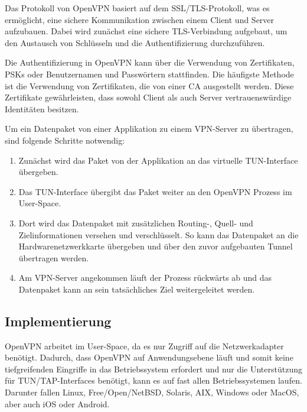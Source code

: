 Das Protokoll von OpenVPN basiert auf dem SSL/TLS-Protokoll, was es ermöglicht, eine sichere Kommunikation zwischen einem Client und Server aufzubauen. Dabei wird zunächst eine sichere TLS-Verbindung aufgebaut, um den Austausch von Schlüsseln und die Authentifizierung durchzuführen. \cite{Mastering_OpenVPN}

Die Authentifizierung in OpenVPN kann über die Verwendung von Zertifikaten, \gls{PSKs} oder Benutzernamen und Passwörtern stattfinden. Die häufigste Methode ist die Verwendung von Zertifikaten, die von einer \gls{CA} ausgestellt werden. Diese Zertifikate gewährleisten, dass sowohl Client als auch Server vertrauenswürdige Identitäten besitzen. \cite{Mastering_OpenVPN, OpenVPN_explained}

Um ein Datenpaket von einer Applikation zu einem \gls{VPN}-Server zu übertragen, sind folgende Schritte notwendig:

\begin{enumerate}
    \item Zunächst wird das Paket von der Applikation an das virtuelle TUN-Interface übergeben.
    \item Das TUN-Interface übergibt das Paket weiter an den OpenVPN Prozess im User-Space.
    \item Dort wird das Datenpaket mit zusätzlichen Routing-, Quell- und Zielinformationen versehen und verschlüsselt. So kann das Datenpaket an die Hardwarenetzwerkkarte übergeben und über den zuvor aufgebauten Tunnel übertragen werden.
    \item Am \gls{VPN}-Server angekommen läuft der Prozess rückwärts ab und das Datenpaket kann an sein tatsächliches Ziel weitergeleitet werden.
\end{enumerate} \cite{Mastering_OpenVPN, OpenVPN_explained}

\subsection{Implementierung}
OpenVPN arbeitet im User-Space, da es nur Zugriff auf die Netzwerkadapter benötigt. Dadurch, dass OpenVPN auf Anwendungsebene läuft und somit keine tiefgreifenden Eingriffe in das Betriebssystem erfordert und nur die Unterstützung für TUN/TAP-Interfaces benötigt, kann es auf fast allen Betriebssystemen laufen. Darunter fallen Linux, Free/Open/NetBSD, Solaris, AIX, Windows oder MacOS, aber auch iOS oder Android. \cite{Mastering_OpenVPN}